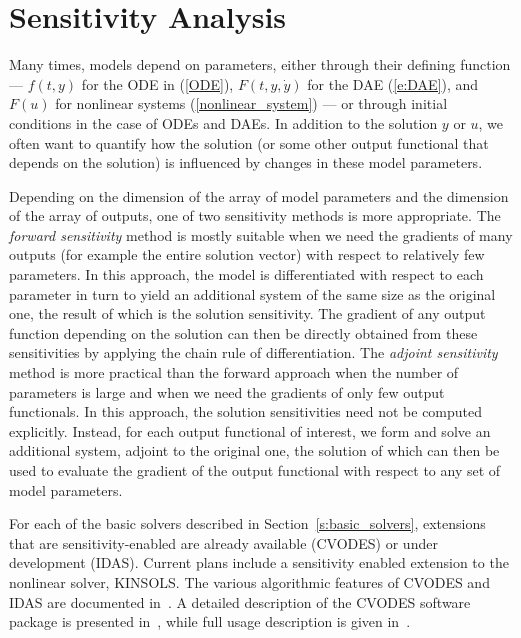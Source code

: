 \section{Sensitivity Analysis}\label{s:sensitivity_analysis}

Many times, models depend on parameters, either through their defining
function --- $f(t,y)$ for the ODE in (\ref{ODE}), $F(t,y,{\dot y})$ for the DAE
(\ref{e:DAE}), and $F(u)$ for nonlinear systems (\ref{nonlinear_system}) 
--- or through initial conditions in the case of ODEs and DAEs. 
In addition to the solution $y$ or $u$, we often want to quantify how 
the solution (or some other output functional that depends on the solution) 
is influenced by changes in these model parameters.

Depending on the dimension of the array of model parameters and the
dimension of the array of outputs, one of two sensitivity methods
is more appropriate. 
%
The {\em forward sensitivity} method is mostly suitable when we need 
the gradients of many outputs (for example the entire solution vector) 
with respect to relatively few parameters.
In this approach, the model is differentiated with respect to each 
parameter in turn to yield an additional system of the same size as
the original one, the result of which is the solution sensitivity.
The gradient of any output function depending on the solution can
then be directly obtained from these sensitivities by applying the
chain rule of differentiation.
%
The {\em adjoint sensitivity} method is more practical than
the forward approach when the number of parameters is large and
when we need the gradients of only few output functionals.
In this approach, the solution sensitivities need not be computed
explicitly. Instead, for each output functional of interest, we form
and solve an additional system, adjoint to the original one, the 
solution of which can then be used to evaluate the gradient of the
output functional with respect to any set of model parameters.

For each of the basic solvers described in Section~\ref{s:basic_solvers},
extensions that are sensitivity-enabled are already available (CVODES)
or under development (IDAS). Current plans include a sensitivity
enabled extension to the nonlinear solver, KINSOLS.
The various algorithmic features of CVODES and IDAS are documented 
in~\cite{CLPS:03}. A detailed description of the CVODES software package 
is presented in~\cite{SeHi:03}, while full usage description is given
in~\cite{HiSe:02}.
%

